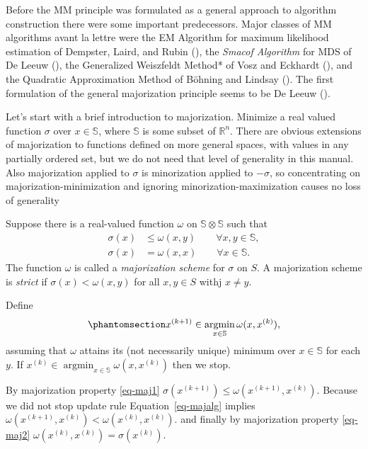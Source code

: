 \documentclass[
  12pt,
  letterpaper,
  DIV=11,
  numbers=noendperiod]{scrartcl}
\begin{document}
Before the MM principle was formulated as a general approach to
algorithm construction there were some important predecessors. Major
classes of MM algorithms avant la lettre were the EM Algorithm for
maximum likelihood estimation of Dempster, Laird, and Rubin
(), the \emph{Smacof
Algorithm} for MDS of De Leeuw (), the
Generalized Weiszfeldt Method* of Vosz and Eckhardt
(), and the Quadratic Approximation
Method of Böhning and Lindsay
(). The first formulation of the
general majorization principle seems to be De Leeuw
().

Let's start with a brief introduction to majorization. Minimize a real
valued function \(\sigma\) over \(x\in\mathbb{S}\), where \(\mathbb{S}\)
is some subset of \(\mathbb{R}^n\). There are obvious extensions of
majorization to functions defined on more general spaces, with values in
any partially ordered set, but we do not need that level of generality
in this manual. Also majorization applied to \(\sigma\) is minorization
applied to \(-\sigma\), so concentrating on majorization-minimization
and ignoring minorization-maximization causes no loss of generality

Suppose there is a real-valued function \(\omega\) on
\(\mathbb{S}\otimes\mathbb{S}\) such that \begin{align}
\sigma(x)&\leq\omega(x,y)\qquad\forall x,y\in\mathbb{S},\label{eq-maj1}\\
\sigma(x)&=\omega(x,x)\qquad\forall x\in\mathbb{S}.\label{eq-maj2}
\end{align} The function \(\omega\) is called a \emph{majorization
scheme} for \(\sigma\) on \(S\). A majorization scheme is \emph{strict}
if \(\sigma(x)<\omega(x,y)\) for all \(x,y\in S\) withj \(x\not=y\).

Define \begin{equation}\phantomsection\label{eq-majalg}{
x^{(k+1)}\in\mathop{\text{argmin}}_{x\in\mathbb{S}}\omega(x,x^{(k)}),
}\end{equation} assuming that \(\omega\) attains its (not necessarily
unique) minimum over \(x\in\mathbb{S}\) for each \(y\). If
\(x^{(k)}\in\mathop{\text{argmin}}_{x\in\mathbb{S}}\omega(x,x^{(k)})\)
then we stop.

By majorization property \eqref{eq-maj1}
\(\sigma(x^{(k+1)})\leq\omega(x^{(k+1)},x^{(k)})\). Because we did not
stop update rule Equation~\ref{eq-majalg} implies
\(\omega(x^{(k+1)},x^{(k)})<\omega(x^{(k)},x^{(k)})\). and finally by
majorization property \eqref{eq-maj2}
\(\omega(x^{(k)},x^{(k)})=\sigma(x^{(k)})\).
\end{document}
